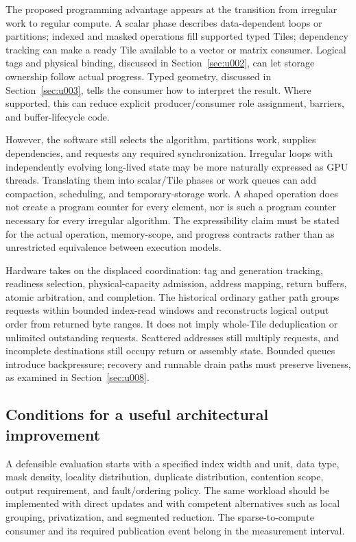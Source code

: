 The proposed programming advantage appears at the transition from irregular work to regular compute. A scalar phase describes data-dependent loops or partitions; indexed and masked operations fill supported typed Tiles; dependency tracking can make a ready Tile available to a vector or matrix consumer. Logical tags and physical binding, discussed in Section~\ref{sec:u002}, can let storage ownership follow actual progress. Typed geometry, discussed in Section~\ref{sec:u003}, tells the consumer how to interpret the result. Where supported, this can reduce explicit producer/consumer role assignment, barriers, and buffer-lifecycle code.

However, the software still selects the algorithm, partitions work, supplies dependencies, and requests any required synchronization. Irregular loops with independently evolving long-lived state may be more naturally expressed as GPU threads. Translating them into scalar/Tile phases or work queues can add compaction, scheduling, and temporary-storage work. A shaped operation does not create a program counter for every element, nor is such a program counter necessary for every irregular algorithm. The expressibility claim must be stated for the actual operation, memory-scope, and progress contracts rather than as unrestricted equivalence between execution models.

Hardware takes on the displaced coordination: tag and generation tracking, readiness selection, physical-capacity admission, address mapping, return buffers, atomic arbitration, and completion. The historical ordinary gather path groups requests within bounded index-read windows and reconstructs logical output order from returned byte ranges. It does not imply whole-Tile deduplication or unlimited outstanding requests. Scattered addresses still multiply requests, and incomplete destinations still occupy return or assembly state. Bounded queues introduce backpressure; recovery and runnable drain paths must preserve liveness, as examined in Section~\ref{sec:u008}.

\subsection{Conditions for a useful architectural improvement}

A defensible evaluation starts with a specified index width and unit, data type, mask density, locality distribution, duplicate distribution, contention scope, output requirement, and fault/ordering policy. The same workload should be implemented with direct updates and with competent alternatives such as local grouping, privatization, and segmented reduction. The sparse-to-compute consumer and its required publication event belong in the measurement interval.

